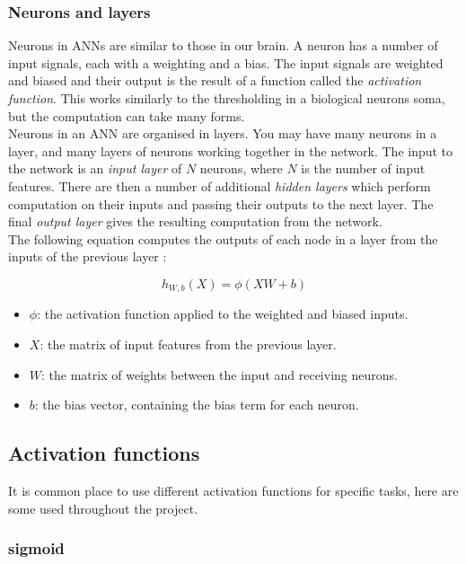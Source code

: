 \documentclass[
    author={Kai Hulme},
    supervisor={Dr Jon Bird},
    degree={BSc},
    title={Generative Adversarial Networks as an Augmentation Technique},
    subtitle={for Alzheimer's Disease Detection in MRI Volumes},
    type={Research},
    year={2021} 
]{dissertation}
\begin{document}
\subsubsection{Neurons and layers}

Neurons in ANNs are similar to those in our brain. A neuron has a number of input signals, each with a weighting and a bias. The input signals are weighted and biased and their output is the result of a function called the \textit{activation function}. This works similarly to the thresholding in a biological neurons soma, but the computation can take many forms. \\

Neurons in an ANN are organised in layers. You may have many neurons in a layer, and many layers of neurons working together in the network. The input to the network is an \textit{input layer} of $N$ neurons, where $N$ is the number of input features. There are then a number of additional \textit{hidden layers} which perform computation on their inputs and passing their outputs to the next layer. The final \textit{output layer} gives the resulting computation from the network. \\

The following equation computes the outputs of each node in a layer from the inputs of the previous layer \cite{geron2019hands}:

\[ h_{W,b}(X)=\phi(XW+b) \]

\begin{itemize}
\item $\phi$: the activation function applied to the weighted and biased inputs.
\item $X$: the matrix of input features from the previous layer.
\item $W$: the matrix of weights between the input and receiving neurons.
\item $b$: the bias vector, containing the bias term for each neuron.
\end{itemize}

\subsection{Activation functions}

It is common place to use different activation functions for specific tasks, here are some used throughout the project.

\subsubsection{sigmoid}
\end{document}
